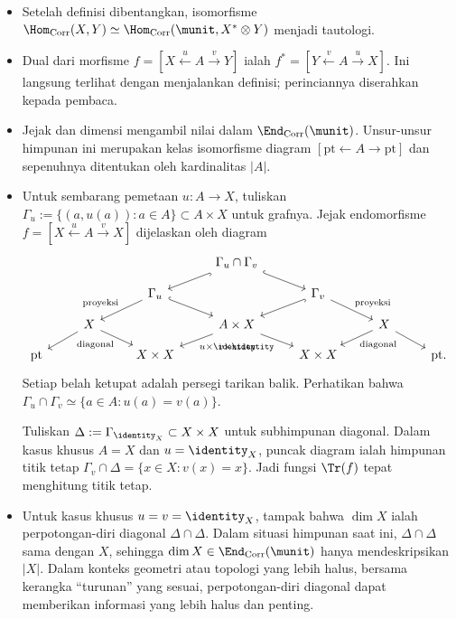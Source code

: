 \begin{example}[Korespondensi]
	\begin{itemize}
		\item Setelah definisi dibentangkan, isomorfisme
		$\Hom_{\mathrm{Corr}}(X,Y)\simeq
		\Hom_{\mathrm{Corr}}(\munit,X^*\otimes Y)$ menjadi tautologi.
		\item Dual dari morfisme
		$f=[X\xleftarrow{u}A\xrightarrow{v}Y]$ ialah
		$f^*=[Y\xleftarrow{v}A\xrightarrow{u}X]$. Ini langsung terlihat
		dengan menjalankan definisi; perinciannya diserahkan kepada pembaca.
		\item Jejak dan dimensi mengambil nilai dalam
		$\End_{\mathrm{Corr}}(\munit)$. Unsur-unsur himpunan ini merupakan
		kelas isomorfisme diagram
		$[\mathrm{pt}\leftarrow A\rightarrow\mathrm{pt}]$ dan sepenuhnya
		ditentukan oleh kardinalitas $|A|$.
		\item Untuk sembarang pemetaan $u:A\to X$, tuliskan
		$\Gamma_u:=\{(a,u(a)):a\in A\}\subset A\times X$ untuk grafnya.
		Jejak endomorfisme
		$f=[X\xleftarrow{u}A\xrightarrow{v}X]$ dijelaskan oleh diagram
		\[\begin{tikzcd}[row sep=small]
			& & &  \Gamma_u \cap \Gamma_v \arrow[hookrightarrow, ld] \arrow[hookrightarrow, rd] & & & \\
			& & \Gamma_u \arrow[ld, "\text{proyeksi}"'] \arrow[hookrightarrow, rd] & & \Gamma_v \arrow[hookrightarrow, ld] \arrow[rd, "\text{proyeksi}"] & & \\
			& X \arrow[ld] \arrow[rd, "\text{diagonal}"'] & & A \times X \arrow[ld, "{u \times \identity}"] \arrow[rd, "{v \times \identity}"'] & & X \arrow[ld, "\text{diagonal}"] \arrow[rd] & \\
			\mathrm{pt} & & X \times X & & X \times X & & \mathrm{pt}.
		\end{tikzcd}\]
		Setiap belah ketupat adalah persegi tarikan balik. Perhatikan bahwa
		$\Gamma_u\cap\Gamma_v\simeq\{a\in A:u(a)=v(a)\}$.

		Tuliskan $\Delta:=\Gamma_{\identity_X}\subset X\times X$ untuk
		subhimpunan diagonal. Dalam kasus khusus $A=X$ dan
		$u=\identity_X$, puncak diagram ialah himpunan titik tetap
		$\Gamma_v\cap\Delta=\{x\in X:v(x)=x\}$. Jadi fungsi $\Tr(f)$
		tepat menghitung titik tetap.

		\item Untuk kasus khusus $u=v=\identity_X$, tampak bahwa $\dim X$
		ialah perpotongan-diri diagonal $\Delta\cap\Delta$. Dalam situasi
		himpunan saat ini, $\Delta\cap\Delta$ sama dengan $X$, sehingga
		$\dim X\in\End_{\mathrm{Corr}}(\munit)$ hanya mendeskripsikan
		$|X|$. Dalam konteks geometri atau topologi yang lebih halus,
		bersama kerangka ``turunan'' yang sesuai, perpotongan-diri diagonal
		dapat memberikan informasi yang lebih halus dan penting.
	\end{itemize}
\end{example}

